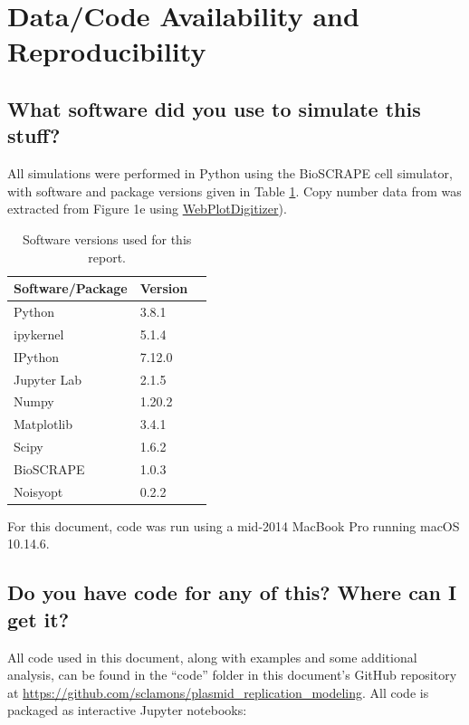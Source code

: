 \documentclass[preprint,12pt]{oldplainarticle}
\begin{document}
\section{Data/Code Availability and Reproducibility}

\subsection{What software did you use to simulate this stuff?}

All simulations were performed in Python using the BioSCRAPE cell simulator, with software and package versions given in Table \ref{tab:versions}. Copy number data from \cite{Shao2021} was extracted from Figure 1e using \href{https://automeris.io/WebPlotDigitizer/}{WebPlotDigitizer}).

\begin{table}[hbt!]
\centering
\begin{tabular}{lll}
\hline
Software/Package & Version\\
\hline
Python & 3.8.1\\
ipykernel & 5.1.4\\
IPython & 7.12.0\\
Jupyter Lab & 2.1.5\\
Numpy & 1.20.2\\
Matplotlib & 3.4.1\\
Scipy & 1.6.2\\
BioSCRAPE & 1.0.3\\
Noisyopt & 0.2.2\\
\hline
\end{tabular}
\caption{Software versions used for this report.}\label{tab:versions}
\end{table}

For this document, code was run using a mid-2014 MacBook Pro running macOS 10.14.6. 

\subsection{Do you have code for any of this? Where can I get it?}

All code used in this document, along with examples and some additional analysis, can be found in the ``code'' folder in this document's GitHub repository at \url{https://github.com/sclamons/plasmid_replication_modeling}. All code is packaged as interactive Jupyter notebooks:
\end{document}
